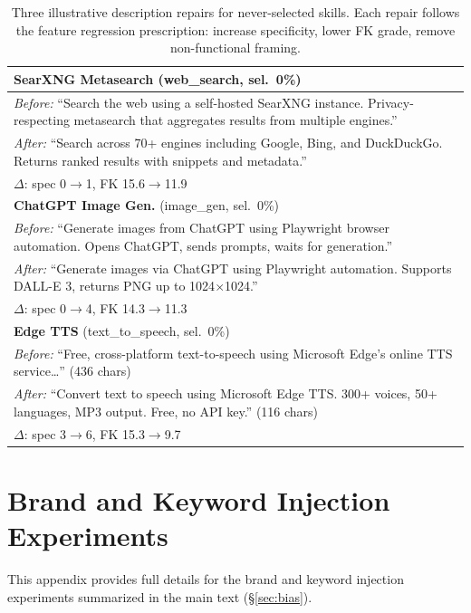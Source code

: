 \documentclass[11pt]{article}
\begin{document}
\begin{table}[t]
\centering\small
\begin{tabular}{p{6.8cm}}
\toprule
\textbf{SearXNG Metasearch} (web\_search, sel.~0\%) \\
\midrule
\textit{Before:} ``Search the web using a self-hosted SearXNG
instance. Privacy-respecting metasearch that aggregates
results from multiple engines.'' \\
\textit{After:} ``Search across 70+ engines including Google,
Bing, and DuckDuckGo. Returns ranked results with
snippets and metadata.'' \\
$\Delta$: spec 0$\to$1, FK 15.6$\to$11.9 \\
\midrule
\textbf{ChatGPT Image Gen.} (image\_gen, sel.~0\%) \\
\midrule
\textit{Before:} ``Generate images from ChatGPT using
Playwright browser automation. Opens ChatGPT, sends
prompts, waits for generation.'' \\
\textit{After:} ``Generate images via ChatGPT using Playwright
automation. Supports DALL-E 3, returns PNG up to
1024$\times$1024.'' \\
$\Delta$: spec 0$\to$4, FK 14.3$\to$11.3 \\
\midrule
\textbf{Edge TTS} (text\_to\_speech, sel.~0\%) \\
\midrule
\textit{Before:} ``Free, cross-platform text-to-speech using
Microsoft Edge's online TTS service\ldots'' (436 chars) \\
\textit{After:} ``Convert text to speech using Microsoft Edge
TTS. 300+ voices, 50+ languages, MP3 output. Free,
no API key.'' (116 chars) \\
$\Delta$: spec 3$\to$6, FK 15.3$\to$9.7 \\
\bottomrule
\end{tabular}
\caption{Three illustrative description repairs for
never-selected skills. Each repair follows the feature
regression prescription: increase specificity, lower
FK grade, remove non-functional framing.}
\label{tab:repair_examples}
\end{table}

\section{Brand and Keyword Injection Experiments}
\label{app:brand_keyword}

This appendix provides full details for the brand and
keyword injection experiments summarized in the main
text (\S\ref{sec:bias}).
\end{document}
